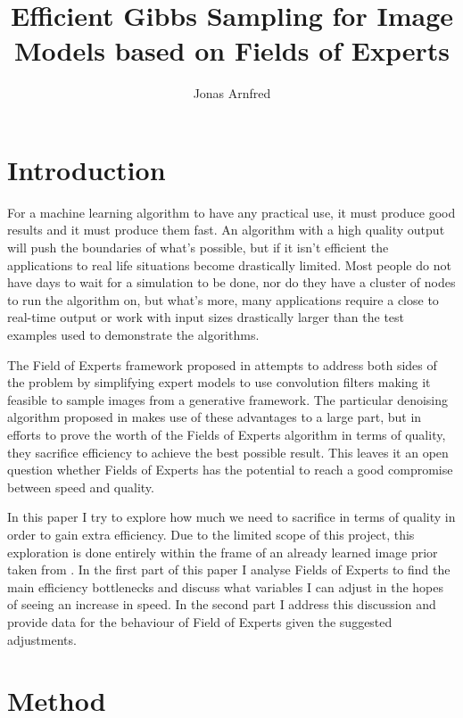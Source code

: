 \documentclass{article}
\begin{document}
\title{Efficient Gibbs Sampling for Image Models based on Fields of 
Experts}

\author{Jonas Arnfred}

\maketitle

\section{Introduction}

For a machine learning algorithm to have any practical use, it must 
produce good results and it must produce them fast. An algorithm with a 
high quality output will push the boundaries of what's possible, but if 
it isn't efficient the applications to real life situations become 
drastically limited.  Most people do not have days to wait for a 
simulation to be done, nor do they have a cluster of nodes to run the 
algorithm on, but what's more, many applications require a close to 
real-time output or work with input sizes drastically larger than the 
test examples used to demonstrate the algorithms.

The Field of Experts framework proposed in \citep{stefan} attempts to 
address both sides of the problem by simplifying expert models to use 
convolution filters making it feasible to sample images from a 
generative framework. The particular denoising algorithm proposed in 
\citep{uwe} makes use of these advantages to a large part, but in 
efforts to prove the worth of the Fields of Experts algorithm in terms 
of quality, they sacrifice efficiency to achieve the best possible 
result. This leaves it an open question whether Fields of Experts has 
the potential to reach a good compromise between speed and quality.

In this paper I try to explore how much we need to sacrifice in terms of 
quality in order to gain extra efficiency. Due to the limited scope of 
this project, this exploration is done entirely within the frame of an 
already learned image prior taken from \citep{uwe}. In the first part of 
this paper I analyse Fields of Experts to find the main efficiency 
bottlenecks and discuss what variables I can adjust in the hopes of 
seeing an increase in speed. In the second part I address this 
discussion and provide data for the behaviour of Field of Experts given 
the suggested adjustments.

\section{Method}
\end{document}
